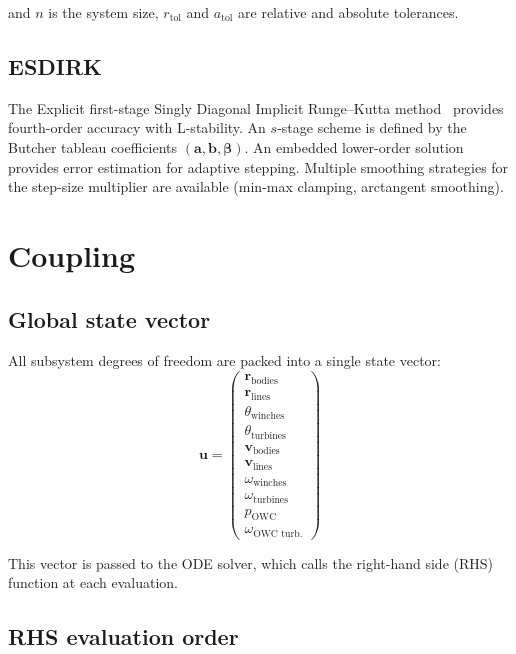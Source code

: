 \documentclass[11pt]{article}
\begin{document}
and $n$ is the system size, $r_{\text{tol}}$ and $a_{\text{tol}}$ are relative and absolute tolerances.

\subsection{ESDIRK}

The Explicit first-stage Singly Diagonal Implicit Runge--Kutta method~\cite{Carpenter-2005} provides fourth-order accuracy with L-stability. An $s$-stage scheme is defined by the Butcher tableau coefficients $(\mathbf{a}, \mathbf{b}, \boldsymbol{\beta})$. An embedded lower-order solution provides error estimation for adaptive stepping. Multiple smoothing strategies for the step-size multiplier are available (min-max clamping, arctangent smoothing).


\section{Coupling}
\label{sec:coupling}

\subsection{Global state vector}

All subsystem degrees of freedom are packed into a single state vector:
\begin{equation}
\mathbf{u} = \begin{pmatrix}
\mathbf{r}_{\text{bodies}} \\ \mathbf{r}_{\text{lines}} \\ \theta_{\text{winches}} \\ \theta_{\text{turbines}} \\ \mathbf{v}_{\text{bodies}} \\ \mathbf{v}_{\text{lines}} \\ \omega_{\text{winches}} \\ \omega_{\text{turbines}} \\ p_{\text{OWC}} \\ \omega_{\text{OWC turb.}}
\end{pmatrix}
\end{equation}

This vector is passed to the ODE solver, which calls the right-hand side (RHS) function at each evaluation.

\subsection{RHS evaluation order}
\end{document}

